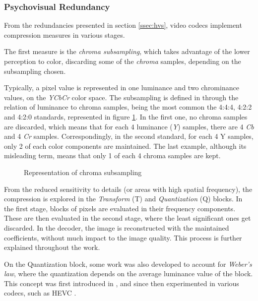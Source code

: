 \subsubsection{Psychovisual Redundancy}

From the redundancies presented in section \ref{ssec:hvs}, video codecs implement compression measures in various stages.

The first measure is the \emph{chroma subsampling}, which takes advantage of the lower perception to color, discarding some of the \emph{chroma} samples, depending on the subsampling chosen.

Typically, a pixel value is represented in one luminance and two chrominance values, on the \emph{YCbCr} color space. The subsampling is defined in through the relation of luminance to chroma samples, being the most common the 4:4:4, 4:2:2 and 4:2:0 standards, represented in figure \ref{fig:subsample}. In the first one, no chroma samples are discarded, which means that for each 4 luminance (\emph{Y}) samples, there are 4 \emph{Cb} and 4 \emph{Cr} samples. Correspondingly, in the second standard, for each 4 Y samples, only 2 of each color components are maintained. The last example, although its misleading term, means that only 1 of each 4 chroma samples are kept.

\begin{figure}[h]
    \centering
    \caption{Representation of chroma subsampling}
    \label{fig:subsample}
\end{figure}

From the reduced sensitivity to details (or areas with high spatial frequency), the compression is explored in the \emph{Transform} (T) and \emph{Quantization} (Q) blocks. In the first stage, blocks of pixels are evaluated in their frequency components. These are then evaluated in the second stage, where the least significant ones get discarded. In the decoder, the image is reconstructed with the maintained coefficients, without much impact to the image quality. This process is further explained throughout the work.

On the Quantization block, some work was also developed to account for \emph{Weber's law}, where the quantization depends on the average luminance value of the block. This concept was first introduced in \cite{watsonEfficiencyModelHuman1988}, and since then experimented in various codecs, such as HEVC \cite{rouisPerceptualVideoContent2018}.


